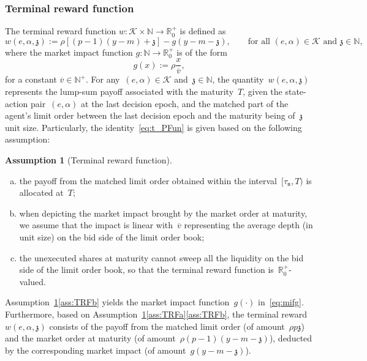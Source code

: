 \documentclass{amsart}[11pt]
\numberwithin{equation}{section}
\theoremstyle{definition}
\newtheorem{assumption}[theorem]{Assumption}
\newcommand{\RR}{\mathbb{R}}
\newcommand{\NN}{\mathbb{N}}
\newcommand{\Kk}{\mathcal{K}}
\newcommand{\nn}{\mathfrak{n}}
\newcommand{\zz}{\mathfrak{z}}
\begin{document}
\subsubsection{Terminal reward function}
The terminal reward function $w:\Kk\times\NN\to\RR^+_0$ is defined as
\begin{equation}\label{eq:t_PFun}
w(e, \alpha, \zz) := 
\rho\left[\left(p - 1\right)\left(y - m\right) + \zz\right] - g\left(y - m - \zz\right),
\qquad\text{for all }(e, \alpha)\in \Kk \text{ and } \zz\in\NN,
\end{equation}
where the market impact function $g: \NN\to \RR^+_0$ is of the form
\begin{equation}\label{eq:mifg}
g(x) :=
\rho\frac{x}{\overline{v}},
\end{equation}
for a constant $\overline{v}\in\NN^+$.
For any~$(e, \alpha)\in \Kk$ and~$\zz\in\NN$,
the quantity~$w(e, \alpha, \zz)$
represents the lump-sum payoff associated with the maturity~$T$,
given the state-action pair~$(e, \alpha)$ at the last decision epoch,
and the matched part of the agent's limit order between the last decision epoch and the maturity being of~$\zz$ unit size.
Particularly,
the identity~\eqref{eq:t_PFun} is given based on the following assumption:
\begin{assumption}[Terminal reward function]\label{ass:TRF}\leavevmode
\begin{enumerate}[(a)]
\item \label{ass:TRFa}the payoff from the matched limit order obtained within the interval~$[\tau_{\nn},T)$ is allocated at~$T$;
\item \label{ass:TRFb}
when depicting the market impact brought by the market order at maturity, 
we assume that the impact is linear with~$\overline{v}$ representing the average depth (in unit size) on the bid side of the limit order book;
\item \label{ass:TRFc}
the unexecuted shares at maturity cannot sweep all the liquidity on the bid side of the limit order book, so that the terminal reward function is~$\RR^+_0$-valued. 
\end{enumerate}
\end{assumption}
Assumption~\ref{ass:TRF}\eqref{ass:TRFb} yields the market impact function~$g(\cdot)$ in~\eqref{eq:mifg}.
Furthermore, based on Assumption~\ref{ass:TRF}\eqref{ass:TRFa}\eqref{ass:TRFb},
the terminal reward~$w(e, \alpha, \zz)$
consists of the payoff from the matched limit order (of amount~$\rho p \zz$) 
and the market order at maturity (of amount~$\rho(p-1)(y-m-\zz)$), 
deducted by the corresponding market impact (of amount~$g(y -m - \zz)$). 
\end{document}

